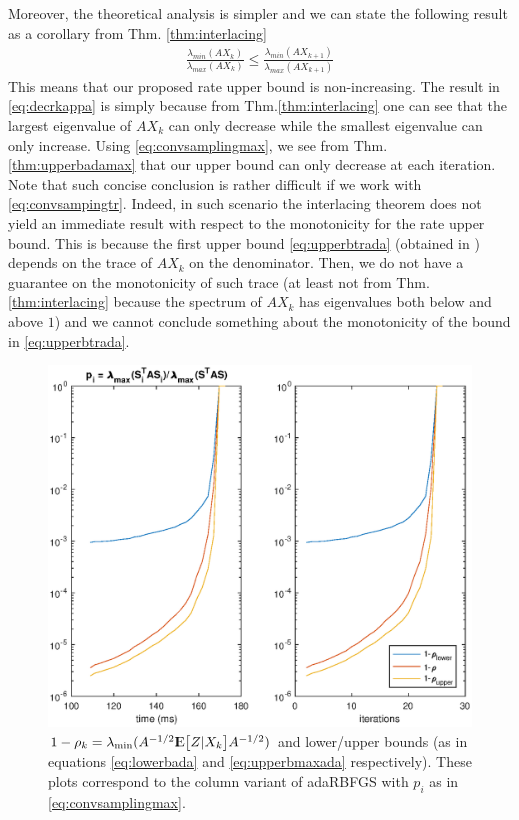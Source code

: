 \documentclass[12pt,conference,compsocconf]{IEEEtran}
\newcommand{\E}{{\rm I\kern-.3em E}}
\begin{document}
Moreover, the theoretical analysis is simpler and we can state the following result as a corollary from Thm. \ref{thm:interlacing}
\begin{align}\label{eq:decrkappa}
	\frac{\lambda_{min}(AX_k)}{\lambda_{max}(AX_k)} \leq \frac{\lambda_{min}(AX_{k+1})}{\lambda_{max}(AX_{k+1})}
\end{align}
This means that our proposed rate upper bound is non-increasing. The result in \eqref{eq:decrkappa} is simply because from Thm.\ref{thm:interlacing} one can see that the largest eigenvalue of $AX_k$ can only decrease while the smallest eigenvalue can only increase. Using \eqref{eq:convsamplingmax}, we see from Thm. \ref{thm:upperbadamax} that our upper bound can only decrease at each iteration. Note that such concise conclusion is rather difficult if we work with \eqref{eq:convsampingtr}. Indeed, in such scenario the interlacing theorem does not yield an immediate result with respect to the monotonicity for the rate upper bound. This is because the first upper bound \eqref{eq:upperbtrada} (obtained in \cite{Gower1}) depends on the trace of $AX_k$ on the denominator. Then, we do not have a guarantee on the monotonicity of such trace (at least not from Thm. \ref{thm:interlacing} because the spectrum of $AX_k$ has eigenvalues both below and above $1$) and we cannot conclude something about the monotonicity of the bound in \eqref{eq:upperbtrada}.
\vspace{-3mm}
\begin{figure}[H]
  \centering
  \includegraphics[height=0.7\columnwidth,width=1.1\columnwidth]{ratemax.eps}
  
  \vspace{-2mm}
  \caption{$1-\rho_k=\lambda_{\text{min}}(A^{-1/2}\E\big[Z|X_k\big]A^{-1/2})$ and lower/upper bounds (as in equations \eqref{eq:lowerbada} and \eqref{eq:upperbmaxada} respectively). These plots correspond to the column variant of adaRBFGS with $p_i$ as in \eqref{eq:convsamplingmax}. \label{fig:ratemax}}  
  
\end{figure}
\end{document}
